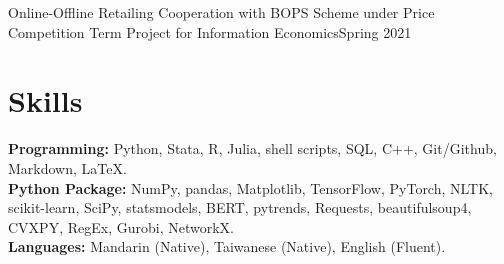 \documentclass{academicThemeCV}
\begin{document}
    \resumeSubheading
    {Online-Offline Retailing Cooperation with BOPS Scheme under Price Competition}{}
    {Term Project for Information Economics}{Spring 2021}
    \resumeItemListStart

    \resumeItemListEnd

  \resumeSubHeadingListEnd




\section{Skills}
  \vspace{1pt}
  \resumeSubHeadingListStart
    \vspace{-5pt}
    \small{\item{
        \textbf{Programming: }{Python, Stata, R, Julia, shell scripts,
        SQL, C++, Git/Github, Markdown, \LaTeX.} \\[3pt]
        \textbf{Python Package: }{
          NumPy, pandas, Matplotlib, TensorFlow, PyTorch, NLTK, scikit-learn, SciPy, statsmodels,
        BERT, pytrends, Requests, beautifulsoup4, CVXPY, RegEx, 
        Gurobi, NetworkX.} \\[3pt]
      \textbf{Languages: }{Mandarin (Native), Taiwanese (Native), English (Fluent).}
        
    }}
  \resumeSubHeadingListEnd



\end{document}
